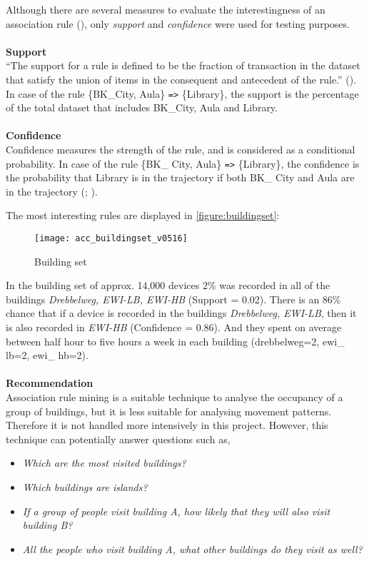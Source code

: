 Although there are several measures to evaluate the interestingness of an
association rule (\cite{zhang_survey_2009}), only \textit{support} and
\textit{confidence} were used for testing purposes.
\\\\
\textbf{Support}\\
“The support for a rule is defined to be the fraction of transaction in the
dataset that satisfy the union of items in the consequent and antecedent of the
rule.” (\cite{agrawal_mining_1993}). In case of the rule \{BK\_City, Aula\}
\verb|=>| \{Library\}, the support is the percentage of the total dataset that
includes BK\_City, Aula and Library.
\\\\
\textbf{Confidence}\\
Confidence measures the strength of the rule, and is considered as a
conditional probability. In case of the rule \{BK\_ City, Aula\} \verb|=>|
\{Library\}, the confidence is the probability that Library is in the
trajectory if both BK\_ City and Aula are in the trajectory
(\cite{agrawal_mining_1993}; \cite{anbukkarasy_interesting_2013}).

The most interesting rules are displayed in \autoref{figure:buildingset}:
\begin{figure}[H]
\centering
\texttt{[image: acc\_buildingset\_v0516]}
\captionsetup{justification=centering}
\caption{Building set}
\label{figure:buildingset}
\end{figure}

In the building set of approx. 14,000 devices 2\% was recorded in all of the buildings \textit{Drebbelweg, EWI-LB, EWI-HB} (Support = 0.02). There is an
86\% chance that if a device is recorded in the buildings \textit{Drebbelweg, EWI-LB}, then it is also recorded in \textit{EWI-HB} (Confidence = 0.86). And
they spent on average between half hour to five hours a week in each building (drebbelweg=2, ewi\_ lb=2, ewi\_ hb=2).
\\\\
\textbf{Recommendation}\\
Association rule mining is a suitable technique to analyse the occupancy of a group of buildings, but it is less suitable for analysing movement patterns.
Therefore it is not handled more intensively in this project. However, this technique can potentially answer questions such as,\\
\begin{itemize}
\item \textit{Which are the most visited buildings?}
\item \textit{Which buildings are islands?}
\item \textit{If a group of people visit building A, how likely that they will also visit building B?}
\item \textit{All the people who visit building A, what other buildings do they visit as well?}
\end{itemize}

